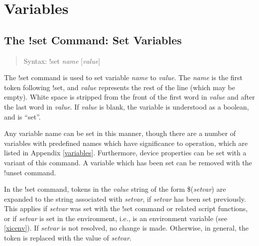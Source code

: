 \section{Variables}
\label{setcmd}

\subsection{The {\cb !set} Command: Set Variables}
\begin{quote}
Syntax: {\vt !set} {\it name} [{\it value\/}]
\end{quote}
The {\cb !set} command is used to set variable {\it name} to {\it
value}.  The {\it name} is the first token following {\cb !set}, and
{\it value} represents the rest of the line (which may be empty). 
White space is stripped from the front of the first word in
{\it value} and after the last word in {\it value}.  If {\it value}
is blank, the variable is understood as a boolean, and is ``set''.

Any variable name can be set in this manner, though there are a number
of variables with predefined names which have significance to {\Xic}
operation, which are listed in Appendix \ref{variables}.  Furthermore,
device properties can be set with a variant of this command.  A
variable which has been set can be removed with the {\cb !unset}
command.

In the {\cb !set} command, tokens in the {\it value} string of the
form \$({\it setvar}) are expanded to the string associated with {\it
setvar}, if {\it setvar} has been set previously.  This applies if
{\it setvar} was set with the {\cb !set} command or related script
functions, or if {\it setvar} is set in the environment, i.e., is an
environment variable (see \ref{xicenv}).  If {\it setvar} is not
resolved, no change is made.  Otherwise, in general, the token is
replaced with the value of {\it setvar}.

